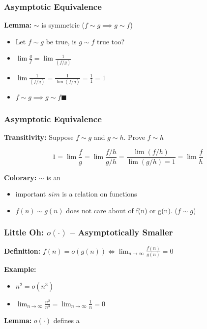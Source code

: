 \documentclass{beamer}
\begin{document}
\begin{frame}
  \frametitle{Asymptotic Equivalence}

  {\larger

    {\bf Lemma:} $\sim$ is symmetric \hfill($f \sim g \implies g\sim f$)

    \begin{itemize}
    \item Let $f \sim g$ be true, is $g \sim f$ true too?
    \item $\lim \frac{g}{f} = \lim \frac{1}{(f/g)}$
    \item $\lim \frac{1}{(f/g)} = \frac{1}{\lim(f/g)} = \frac{1}{1} = 1$
    \item $f \sim g \implies g\sim f$\hfill$\blacksquare$
    \end{itemize}

  }
\end{frame}

\begin{frame}
  \frametitle{Asymptotic Equivalence}

  {\larger

    {\bf Transitivity:} Suppose $f \sim g$ and $g \sim h$. Prove $f \sim h$

    \bigskip

    \begin{equation}
      1 = \lim\frac{f}{g} = \lim\frac{f/h}{g/h} = \frac{\lim(f/h)}{\lim(g/h) = 1} = \lim\frac{f}{h} 
    \end{equation}

    \vfill

    {\bf Colorary:} $\sim$ is an 

    \begin{itemize}
    \item \alert{important} $sim$ is a relation \alert{on functions}
    \item $f(n) \sim g(n)$ does not care about  of f(n) or g(n). ($f \sim g$)
    \end{itemize}
    
  }
\end{frame}

\begin{frame}
  \frametitle{Little Oh: $o(\cdot)$ -- Asymptotically Smaller}

  {\larger
    {\bf Definition:} $f(n) = o(g(n))\iff \lim_{n\to\infty}\frac{f(n)}{g(n)} = 0$

    \bigskip

    {\bf Example:}
    \begin{itemize}
    \item $n^2 = o(n^3)$
    \item $\lim_{n\to\infty}\frac{n^2}{n^3} = \lim_{n\to\infty}\frac{1}{n} = 0$
    \end{itemize}

    \bigskip

    {\bf Lemma:} $o(\cdot)$ defines a     
  }
\end{frame}
\end{document}
